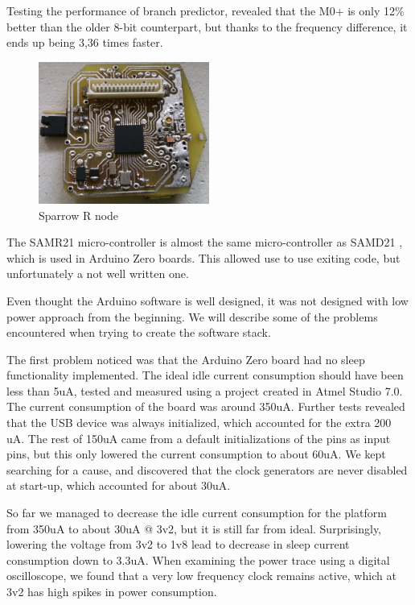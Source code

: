 Testing the performance of branch predictor, revealed that the M0+ is only 12\% better than
the older 8-bit counterpart, but thanks to the frequency difference, it ends up being 3,36 times
faster.


\begin{figure}[ht] \centering
\includegraphics[width=0.5\textwidth]{img/sparrowrf.jpg}
\caption{Sparrow R node}
\end{figure}

The SAMR21 micro-controller is almost the same micro-controller as SAMD21 \cite{samd21}, which is used in Arduino
Zero boards. This allowed use to use exiting code, but unfortunately a not well
written one.

Even thought the Arduino software is well designed, it was not designed with low power approach
from the beginning. We will describe some of the problems encountered when trying to create the software stack.

The first problem noticed was that the Arduino Zero board had no sleep functionality implemented.
The ideal idle current consumption should have been less than 5uA, tested and measured using a
project created in Atmel Studio 7.0. The current consumption of the board was around 350uA. Further
tests revealed that the USB device was always initialized, which accounted for the extra 200
uA. The rest of 150uA came from a default initializations of the pins as input pins, but this only
lowered the current consumption to about 60uA. We kept searching for a cause, and discovered that
the clock generators are never disabled at start-up, which accounted for about 30uA.

So far we managed to decrease the idle current consumption for the platform from 350uA to about
30uA @ 3v2, but it is still far from ideal. Surprisingly, lowering the voltage from 3v2 to 1v8 lead
to  decrease in sleep current consumption down to 3.3uA. When examining the power trace using a digital oscilloscope, we found
that a very low frequency clock remains active, which at 3v2 has high spikes in power consumption.

